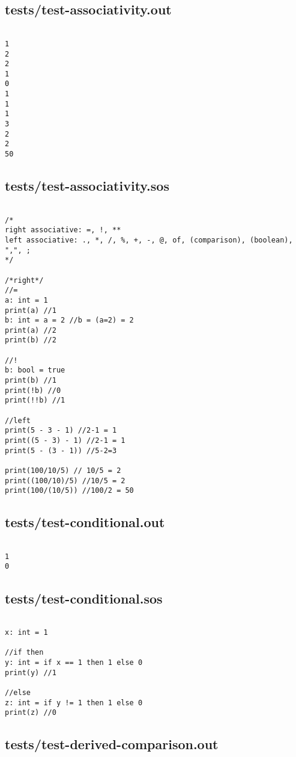 \documentclass[main.tex]{subfiles}
\begin{document}
\subsection{tests/test-associativity.out}

\begin{lstlisting}

1
2
2
1
0
1
1
1
3
2
2
50
\end{lstlisting}

\subsection{tests/test-associativity.sos}

\begin{lstlisting}

/* 
right associative: =, !, **
left associative: ., *, /, %, +, -, @, of, (comparison), (boolean), ",", ;
*/

/*right*/
//=
a: int = 1
print(a) //1
b: int = a = 2 //b = (a=2) = 2
print(a) //2
print(b) //2

//!
b: bool = true
print(b) //1
print(!b) //0
print(!!b) //1

//left
print(5 - 3 - 1) //2-1 = 1
print((5 - 3) - 1) //2-1 = 1
print(5 - (3 - 1)) //5-2=3

print(100/10/5) // 10/5 = 2
print((100/10)/5) //10/5 = 2
print(100/(10/5)) //100/2 = 50
\end{lstlisting}

\subsection{tests/test-conditional.out}

\begin{lstlisting}

1
0
\end{lstlisting}

\subsection{tests/test-conditional.sos}

\begin{lstlisting}

x: int = 1

//if then
y: int = if x == 1 then 1 else 0
print(y) //1

//else
z: int = if y != 1 then 1 else 0
print(z) //0
\end{lstlisting}

\subsection{tests/test-derived-comparison.out}
\end{document}
